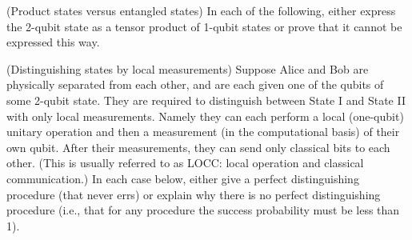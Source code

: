 \begin{questions}
\begin{parts}
  \end{parts}
  \question (Product states versus entangled states) In each of the
  following, either express the 2-qubit state as a tensor product of
  1-qubit states or prove that it cannot be expressed this way. 

  \question (Distinguishing states by local measurements) Suppose
  Alice and Bob are physically separated from each other, and are each
  given one of the qubits of some 2-qubit state. They are required to
  distinguish between State I and State II with only local
  measurements. Namely they can each perform a local (one-qubit)
  unitary operation and then a measurement (in the computational
  basis) of their own qubit. After their measurements, they can send
  only classical bits to each other. (This is usually referred to as
  LOCC: local operation and classical communication.)  In each case
  below, either give a perfect distinguishing procedure (that never
  errs) or explain why there is no perfect distinguishing procedure
  (i.e., that for any procedure the success probability must be less
  than 1).



\end{questions}
